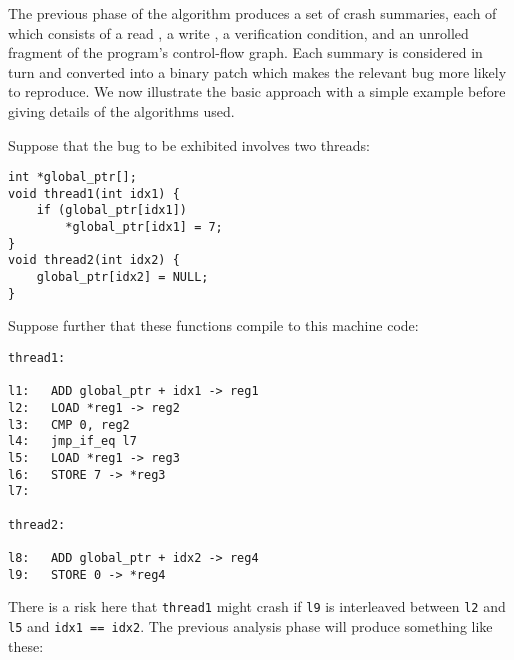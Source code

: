 \documentclass[12pt,a4paper]{book}
\begin{document}
The previous phase of the algorithm produces a set of crash summaries, each of which consists of a read \StateMachine, a write \StateMachine, a verification condition, and an unrolled fragment of the program's control-flow graph.
Each summary is considered in turn and converted into a binary patch which makes the relevant bug more likely to reproduce.
We now illustrate the basic approach with a simple example before giving details of the algorithms used.

Suppose that the bug to be exhibited involves two threads:

\begin{verbatim}
int *global_ptr[];
void thread1(int idx1) {
    if (global_ptr[idx1])
        *global_ptr[idx1] = 7;
} 
void thread2(int idx2) {
    global_ptr[idx2] = NULL;
}
\end{verbatim}

Suppose further that these functions compile to this machine code:

\begin{verbatim}
thread1:

l1:   ADD global_ptr + idx1 -> reg1
l2:   LOAD *reg1 -> reg2
l3:   CMP 0, reg2
l4:   jmp_if_eq l7
l5:   LOAD *reg1 -> reg3
l6:   STORE 7 -> *reg3
l7:

thread2:

l8:   ADD global_ptr + idx2 -> reg4
l9:   STORE 0 -> *reg4
\end{verbatim}

There is a risk here that \verb|thread1| might crash if \verb|l9| is interleaved between \verb|l2| and \verb|l5| and \verb|idx1 == idx2|.
The previous analysis phase will produce \StateMachines something like these:

\end{document}
